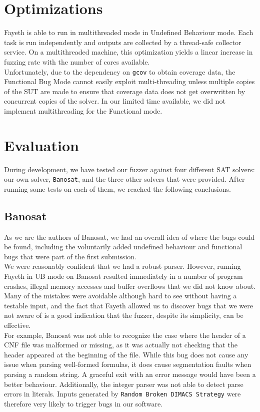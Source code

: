 \documentclass{article}
\begin{document}
\section{Optimizations}

Fayeth is able to run in multithreaded mode in Undefined Behaviour mode. Each task is run independently
and outputs are collected by a thread-safe collector service. On a multithreaded machine, this optimization
yields a linear increase in fuzzing rate with the number of cores available.\\

Unfortunately, due to the dependency on \verb|gcov| to obtain coverage data, the Functional Bug Mode cannot
easily exploit multi-threading unless multiple copies of the SUT are made to ensure that coverage data does
not get overwritten by concurrent copies of the solver. In our limited time available, we did not implement
multithreading for the Functional mode.

\section{Evaluation}

During development, we have tested our fuzzer against four different SAT solvers: our own solver, \verb|Banosat|, and
the three other solvers that were provided. After running some tests on each of them, we reached the following conclusions.

\subsection{Banosat}

As we are the authors of Banosat, we had an overall idea of where the bugs could be found, 
including the voluntarily added undefined behaviour and functional bugs that were part of the first submission.\\

We were reasonably confident that we had a robust parser. However, running Fayeth in UB mode on
Banosat resulted immediately in a number of program crashes, illegal memory accesses and buffer overflows
that we did not know about. Many of the mistakes were avoidable although hard to see without having
a testable input, and the fact that Fayeth allowed us to discover bugs that we were not aware of is
a good indication that the fuzzer, despite its simplicity, can be effective. \\

For example, Banosat was not able to recognize the case where the header of a CNF file was malformed or missing,
as it was actually not checking that the header appeared at the beginning of the file. While this bug
does not cause any issue when parsing well-formed formulas, it does cause segmentation faults when parsing
a random string. A graceful exit with an error message would have been a better behaviour.
Additionally, the integer parser was not able to detect parse errors in literals. Inputs generated
by \verb|Random Broken DIMACS Strategy| were therefore very likely to trigger bugs in our software. \\
\end{document}
